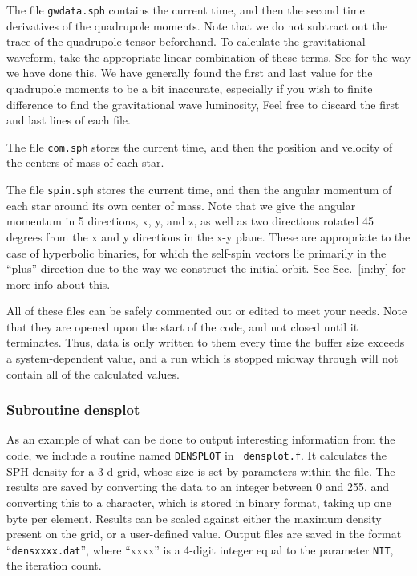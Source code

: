 The file {\tt gwdata.sph} contains the current time, and then the
second time derivatives of the quadrupole moments.  Note that we do
not subtract out the trace of the quadrupole tensor beforehand.  To
calculate the gravitational waveform, take the appropriate linear
combination of these terms.  See \citet{FR1} for the way we have done
this.
We have generally found the first and last value for the quadrupole
moments to be a bit inaccurate, especially if you wish to finite
difference to find the gravitational wave luminosity,  Feel free to
discard the first and last lines of each file.

The file {\tt com.sph} stores the current time, and then the position
and velocity of the centers-of-mass of each star.

The file {\tt spin.sph} stores the current time, and then the angular
momentum of each star around its own center of mass.  Note that we
give the angular momentum in 5 directions, x, y, and z, as well as two
directions rotated 45 degrees from the x and y directions in the x-y
plane. These are appropriate to the case of hyperbolic binaries, for
which the self-spin vectors lie primarily in the ``plus'' direction
due to the way we construct the initial orbit.  See Sec.~\ref{in:hy}
for more info about this.

All of these files can be safely commented out or edited to meet your
needs.  Note that they are opened upon the start of the code, and not
closed until it terminates.  Thus, data is only written to them every
time the buffer size exceeds a system-dependent value, and a run which
is stopped midway through will not contain all of the calculated
values.

\subsubsection{Subroutine densplot}\label{io:ou:de}
As an example of what can be done to output interesting information
from the code, we include a routine named {\tt DENSPLOT} in {\tt
densplot.f}.  It calculates the SPH density for a 3-d grid, whose size
is set by parameters within the file.  The results are saved by
converting the data to an integer between 0 and 255, and converting
this to a character, which is stored in binary format, taking up one
byte per element.  Results can be scaled against either the maximum
density present on the grid, or a user-defined value.  Output files
are saved in the format ``{\tt densxxxx.dat}'', where ``xxxx'' is a
4-digit integer equal to the parameter {\tt NIT}, the iteration count. 

